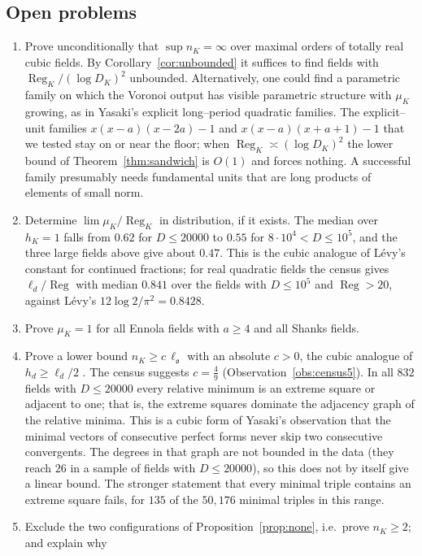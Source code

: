 \documentclass[11pt,reqno]{amsart}
\theoremstyle{plain}
\theoremstyle{definition}
\newcommand{\Reg}{\operatorname{Reg}}
\newcommand{\Ok}{\mathfrak{o}}
\newcommand{\nK}{n_K}
\newcommand{\muK}{\mu_K}
\begin{document}
\subsection{Open problems}
\begin{enumerate}[label=\textup{(\arabic*)},leftmargin=2.2em]
\item Prove unconditionally that $\sup\nK=\infty$ over maximal orders of totally real cubic fields. By
Corollary~\ref{cor:unbounded} it suffices to find fields with $\Reg_K/(\log D_K)^2$ unbounded. Alternatively,
one could find a parametric family on which the Voronoi output has visible parametric structure with $\muK$
growing, as in Yasaki's explicit long--period quadratic families. The explicit--unit families
$x(x-a)(x-2a)-1$ and $x(x-a)(x+a+1)-1$ that we tested stay on or near the floor; when $\Reg_K\asymp(\log D_K)^2$ the lower bound of
Theorem~\ref{thm:sandwich} is $O(1)$ and forces nothing. A successful family presumably needs fundamental
units that are long products of elements of small norm.
\item Determine $\lim\muK/\Reg_K$ in distribution, if it exists. The median over $h_K=1$ falls from $0.62$
for $D\le20000$ to $0.55$ for $8\cdot10^4<D\le10^5$, and the three large fields above give about $0.47$. This
is the cubic analogue of Lévy's constant for continued fractions; for real quadratic fields the census gives
$\ell_d/\Reg$ with median $0.841$ over the fields with $D\le10^5$ and $\Reg>20$, against Lévy's
$12\log2/\pi^2=0.8428$.
\item Prove $\muK=1$ for all Ennola fields with $a\ge4$ and all Shanks fields.
\item\label{prob:lower} Prove a lower bound $\nK\ge c\,\ell_\Ok$ with an absolute $c>0$, the cubic analogue of
$h_d\ge\ell_d/2$ \cite[Thm.~5.1]{Yasaki}. The census suggests $c=\tfrac49$
(Observation~\ref{obs:census5}). In all $832$ fields with $D\le20000$ every relative minimum is an extreme
square or adjacent to one; that is, the extreme squares dominate the adjacency graph of the relative
minima. This is a cubic form of Yasaki's observation that the minimal vectors of consecutive perfect forms
never skip two consecutive convergents. The degrees in that graph are not bounded in the data (they reach
$26$ in a sample of fields with $D\le20000$), so this does not by itself give a linear bound. The stronger
statement that every minimal triple contains an extreme square fails, for $135$ of the $50{,}176$ minimal
triples in this range.
\item Exclude the two configurations of Proposition~\ref{prop:none}, i.e.\ prove $\nK\ge2$; and explain why

\end{enumerate}
\end{document}
